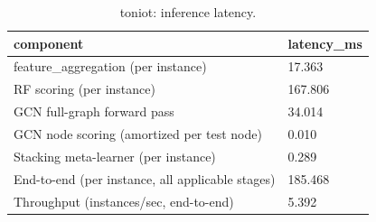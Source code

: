 \begin{table}[t]
\centering
\caption{toniot: inference latency.}
\label{tab:toniot_inference_latency}
\begin{tabular}{ll}
\toprule
component & latency\_ms \\
\midrule
feature\_aggregation (per instance) & 17.363 \\
RF scoring (per instance) & 167.806 \\
GCN full-graph forward pass & 34.014 \\
GCN node scoring (amortized per test node) & 0.010 \\
Stacking meta-learner (per instance) & 0.289 \\
End-to-end (per instance, all applicable stages) & 185.468 \\
Throughput (instances/sec, end-to-end) & 5.392 \\
\bottomrule
\end{tabular}
\end{table}
